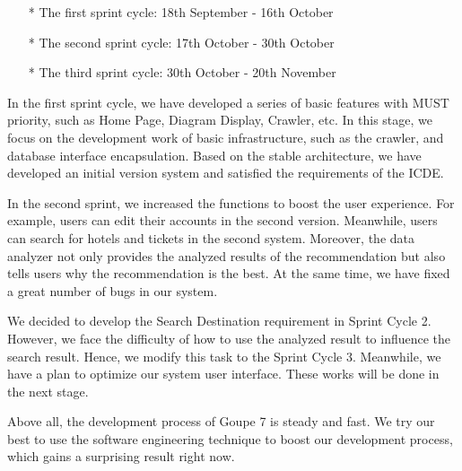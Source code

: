 \documentclass[conference]{IEEEtran}
\begin{document}
\begin{itemize}
\item[*] The first sprint cycle: 18th September - 16th October
\item[*] The second sprint cycle: 17th October - 30th October
\item[*] The third sprint cycle: 30th October - 20th November
\end{itemize}

In the first sprint cycle, we have developed a series of basic features with MUST priority, such as Home Page, Diagram Display, Crawler, etc. In this stage, we focus on the development work of basic infrastructure, such as the crawler, and database interface encapsulation. Based on the stable architecture, we have developed an initial version system and satisfied the requirements of the ICDE.

In the second sprint, we increased the functions to boost the user experience. For example, users can edit their accounts in the second version. Meanwhile, users can search for hotels and tickets in the second system. Moreover, the data analyzer not only provides the analyzed results of the recommendation but also tells users why the recommendation is the best. At the same time, we have fixed a great number of bugs in our system.

We decided to develop the Search Destination requirement in Sprint Cycle 2. However, we face the difficulty of how to use the analyzed result to influence the search result. Hence, we modify this task to the Sprint Cycle 3. Meanwhile, we have a plan to optimize our system user interface. These works will be done in the next stage.

Above all, the development process of Goupe 7 is steady and fast. We try our best to use the software engineering technique to boost our development process, which gains a surprising result right now.
\end{document}
